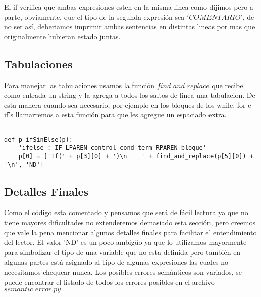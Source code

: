 El if verifica que ambas expresiones esten en la misma linea como dijimos pero a parte, obviamente, que el tipo de la segunda expresión sea $'COMENTARIO'$, de no ser así, deberiamos imprimir ambas sentencias en distintas lineas por mas que originalmente hubieran estado juntas.

\subsection{Tabulaciones}

Para manejar las tabulaciones usamos la función $find\_and\_replace$ que recibe como entrada un string y la agrega a todos los saltos de linea una tabulacion. De esta manera cuando sea necesario, por ejemplo en los bloques de los while, for e if's llamarremos a esta función para que les agregue un espaciado extra.

\begin{verbatim}

def p_ifSinElse(p):
    'ifelse : IF LPAREN control_cond_term RPAREN bloque'
    p[0] = ['If(' + p[3][0] + ')\n    ' + find_and_replace(p[5][0]) + '\n', 'ND']

\end{verbatim}

\subsection{Detalles Finales}

Como el código esta comentado y pensamos que será de fácil lectura ya que no tiene mayores dificultades no extenderemos demasiado esta sección, pero creemos que vale la pena mencionar algunos detalles finales para facilitar el entendimiento del lector. El valor 'ND' es un poco ambigüo ya que lo utilizamos mayormente para simbolizar el tipo de una variable que no esta definida pero también en algunas partes está asignado al tipo de algunas expresiones las cuales no necesitamos chequear nunca. Los posibles errores semánticos son variados, se puede encontrar el listado de todos los errores posibles en el archivo $semantic\_error.py$